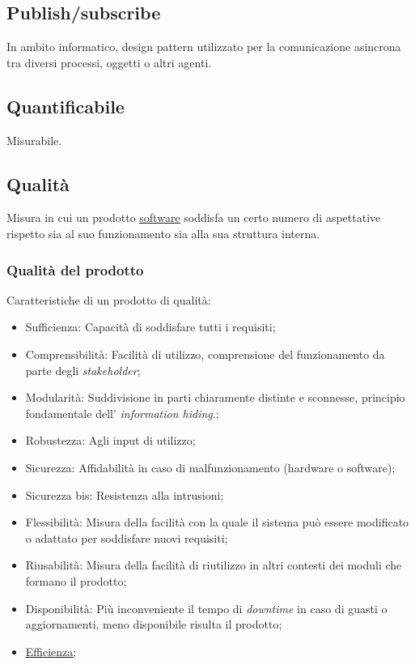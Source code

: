 	\subsection{Publish/subscribe}
\label{sec:pubsub}
In ambito informatico, design pattern utilizzato per la comunicazione asincrona tra diversi processi, oggetti o altri agenti.
\newpage


	\subsection{Quantificabile}
	\label{sec:quantificabile}
	Misurabile.
	
	\subsection{Qualità} 
	\label{sec:qualita}
	 Misura in cui un prodotto \underline{\hyperref[sec:prodottosoftware]{software}} soddisfa un certo numero di aspettative rispetto sia al suo funzionamento sia alla sua struttura interna.
	\subsubsection{Qualità del prodotto}
	\label{sec:qualitaprodotto}
	Caratteristiche di un prodotto di qualità:
	\begin{itemize}  
	\item Sufficienza: Capacità di soddisfare tutti i requisiti;
	\item Comprensibilità: Facilità di utilizzo, comprensione del funzionamento da parte degli  \emph{stakeholder};
	\item Modularità: Suddivisione in parti chiaramente distinte e sconnesse, principio fondamentale dell' \emph{information hiding}.;
	\item Robustezza: Agli input di utilizzo;
	\item Sicurezza: Affidabilità in caso di malfunzionamento (hardware o software);
	\item Sicurezza bis: Resistenza alla intrusioni;
	\item Flessibilità: Misura della facilità con la quale il sistema può essere modificato o adattato per soddisfare nuovi requisiti;
	\item Riusabilità: Misura della facilità di riutilizzo in altri contesti dei moduli che formano il prodotto;
	\item Disponibilità: Più inconveniente il tempo di \emph{downtime} in caso di guasti o aggiornamenti, meno disponibile risulta il prodotto;	
	\item \underline{\hyperref[sec:efficienza]{Efficienza}};
	\end{itemize}
